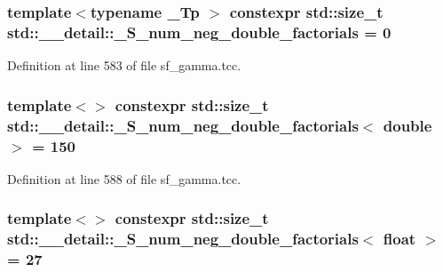 \subsubsection[{\texorpdfstring{\+\_\+\+S\+\_\+num\+\_\+neg\+\_\+double\+\_\+factorials}{_S_num_neg_double_factorials}}]{\setlength{\rightskip}{0pt plus 5cm}template$<$typename \+\_\+\+Tp $>$ constexpr std\+::size\+\_\+t std\+::\+\_\+\+\_\+detail\+::\+\_\+\+S\+\_\+num\+\_\+neg\+\_\+double\+\_\+factorials = 0}\hypertarget{namespacestd_1_1____detail_ac386f200e589ce1fc895c2aac0e47f8c}{}\label{namespacestd_1_1____detail_ac386f200e589ce1fc895c2aac0e47f8c}


Definition at line 583 of file sf\+\_\+gamma.\+tcc.

\subsubsection[{\texorpdfstring{\+\_\+\+S\+\_\+num\+\_\+neg\+\_\+double\+\_\+factorials$<$ double $>$}{_S_num_neg_double_factorials< double >}}]{\setlength{\rightskip}{0pt plus 5cm}template$<$$>$ constexpr std\+::size\+\_\+t {\bf std\+::\+\_\+\+\_\+detail\+::\+\_\+\+S\+\_\+num\+\_\+neg\+\_\+double\+\_\+factorials}$<$ double $>$ = 150}\hypertarget{namespacestd_1_1____detail_a2d14a1207a6fea22f32586dfd41cf49d}{}\label{namespacestd_1_1____detail_a2d14a1207a6fea22f32586dfd41cf49d}


Definition at line 588 of file sf\+\_\+gamma.\+tcc.

\subsubsection[{\texorpdfstring{\+\_\+\+S\+\_\+num\+\_\+neg\+\_\+double\+\_\+factorials$<$ float $>$}{_S_num_neg_double_factorials< float >}}]{\setlength{\rightskip}{0pt plus 5cm}template$<$$>$ constexpr std\+::size\+\_\+t {\bf std\+::\+\_\+\+\_\+detail\+::\+\_\+\+S\+\_\+num\+\_\+neg\+\_\+double\+\_\+factorials}$<$ float $>$ = 27}\hypertarget{namespacestd_1_1____detail_a3ce62e66e9a196fd89b4d841f7374d68}{}\label{namespacestd_1_1____detail_a3ce62e66e9a196fd89b4d841f7374d68}


